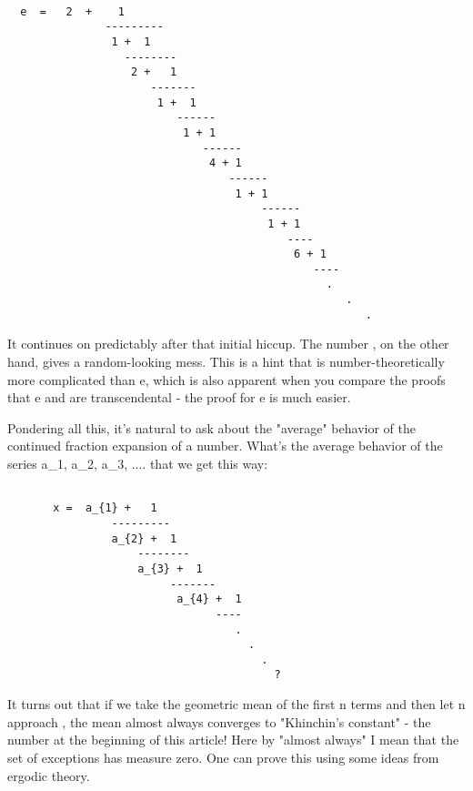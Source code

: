 \begin{verbatim}

  e  =   2  +    1
               ---------
                1 +  1
                  --------
                   2 +   1
                      -------
                       1 +  1
                          ------
                           1 + 1
                              ------
                               4 + 1
                                  ------
                                   1 + 1
                                       ------
                                        1 + 1
                                           ---- 
                                            6 + 1 
                                               ----
                                                 .
                                                    .
                                                       .
\end{verbatim}
    
It continues on predictably after that initial hiccup.  The number \pi ,
on the other hand, gives a random-looking mess.  This is a hint that
\pi  is number-theoretically more complicated than e, which is also
apparent when you compare the proofs that e and \pi  are transcendental
- the proof for e is much easier.

Pondering all this, it's natural to ask about the "average" behavior
of the continued fraction expansion of a number.   What's the average
behavior of the series a_{1}, 
a_{2}, a_{3}, .... that we get this way:


\begin{verbatim}

       x =  a_{1} +   1
                ---------
                a_{2} +  1
                    -------- 
                    a_{3} +  1
                         -------
                          a_{4} +  1
                                ----
                                   .
                                     .
                                       .
                                         ?
\end{verbatim}
    
It turns out that if we take the geometric mean of the first n terms
and then let n approach \infty , the mean almost always converges to
"Khinchin's constant" - the number at the beginning of this article!
Here by "almost always" I mean that the set of exceptions has measure
zero.  One can prove this using some ideas from ergodic theory.



